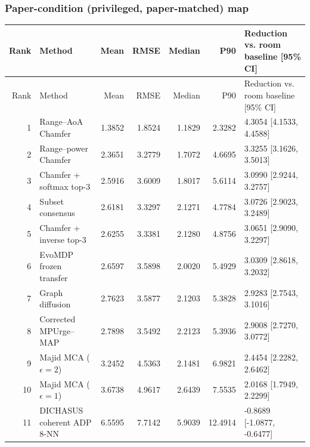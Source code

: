 \subsubsection{Paper-condition (privileged, paper-matched) map}
\begingroup\scriptsize\setlength{\tabcolsep}{3.2pt}
\begin{longtable}{@{}r p{.28\linewidth} r r r r p{.23\linewidth}@{}}
\toprule Rank & Method & Mean & RMSE & Median & P90 & Reduction vs. room baseline [95\% CI] \\
\midrule\endfirsthead
\toprule Rank & Method & Mean & RMSE & Median & P90 & Reduction vs. room baseline [95\% CI] \\
\midrule\endhead
1 & Range--AoA Chamfer & 1.3852 & 1.8524 & 1.1829 & 2.3282 & 4.3054 [4.1533, 4.4588] \\
2 & Range--power Chamfer & 2.3651 & 3.2779 & 1.7072 & 4.6695 & 3.3255 [3.1626, 3.5013] \\
3 & Chamfer + softmax top-3 & 2.5916 & 3.6009 & 1.8017 & 5.6114 & 3.0990 [2.9244, 3.2757] \\
4 & Subset consensus & 2.6181 & 3.3297 & 2.1271 & 4.7784 & 3.0726 [2.9023, 3.2489] \\
5 & Chamfer + inverse top-3 & 2.6255 & 3.3381 & 2.1280 & 4.8756 & 3.0651 [2.9090, 3.2297] \\
6 & EvoMDP frozen transfer & 2.6597 & 3.5898 & 2.0020 & 5.4929 & 3.0309 [2.8618, 3.2032] \\
7 & Graph diffusion & 2.7623 & 3.5877 & 2.1203 & 5.3828 & 2.9283 [2.7543, 3.1016] \\
8 & Corrected MPUrge--MAP & 2.7898 & 3.5492 & 2.2123 & 5.3936 & 2.9008 [2.7270, 3.0772] \\
9 & Majid MCA ($\epsilon=2$) & 3.2452 & 4.5363 & 2.1481 & 6.9821 & 2.4454 [2.2282, 2.6462] \\
10 & Majid MCA ($\epsilon=1$) & 3.6738 & 4.9617 & 2.6439 & 7.5535 & 2.0168 [1.7949, 2.2299] \\
11 & DICHASUS coherent ADP 8-NN & 6.5595 & 7.7142 & 5.9039 & 12.4914 & -0.8689 [-1.0877, -0.6477] \\
\bottomrule
\end{longtable}\endgroup
